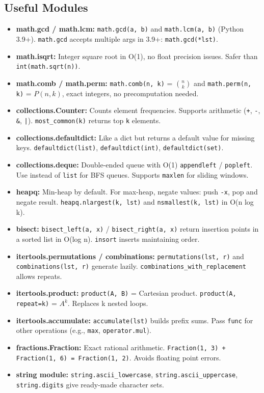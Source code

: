 \subsection{Useful Modules}

\begin{itemize}
    \item \textbf{math.gcd / math.lcm: } \texttt{math.gcd(a, b)} and \texttt{math.lcm(a, b)} (Python 3.9+). \texttt{math.gcd} accepts multiple args in 3.9+: \texttt{math.gcd(*lst)}.
    \item \textbf{math.isqrt: } Integer square root in O(1), no float precision issues. Safer than \texttt{int(math.sqrt(n))}.
    \item \textbf{math.comb / math.perm: } \texttt{math.comb(n, k)} = $\binom{n}{k}$ and \texttt{math.perm(n, k)} = $P(n,k)$, exact integers, no precomputation needed.
    \item \textbf{collections.Counter: } Counts element frequencies. Supports arithmetic (\texttt{+}, \texttt{-}, \texttt{\&}, \texttt{|}). \texttt{most\_common(k)} returns top \texttt{k} elements.
    \item \textbf{collections.defaultdict: } Like a dict but returns a default value for missing keys. \texttt{defaultdict(list)}, \texttt{defaultdict(int)}, \texttt{defaultdict(set)}.
    \item \textbf{collections.deque: } Double-ended queue with O(1) \texttt{appendleft} / \texttt{popleft}. Use instead of \texttt{list} for BFS queues. Supports \texttt{maxlen} for sliding windows.
    \item \textbf{heapq: } Min-heap by default. For max-heap, negate values: push \texttt{-x}, pop and negate result. \texttt{heapq.nlargest(k, lst)} and \texttt{nsmallest(k, lst)} in O(n log k).
    \item \textbf{bisect: } \texttt{bisect\_left(a, x)} / \texttt{bisect\_right(a, x)} return insertion points in a sorted list in O(log n). \texttt{insort} inserts maintaining order.
    \item \textbf{itertools.permutations / combinations: } \texttt{permutations(lst, r)} and \texttt{combinations(lst, r)} generate lazily. \texttt{combinations\_with\_replacement} allows repeats.
    \item \textbf{itertools.product: } \texttt{product(A, B)} = Cartesian product. \texttt{product(A, repeat=k)} = $A^k$. Replaces k nested loops.
    \item \textbf{itertools.accumulate: } \texttt{accumulate(lst)} builds prefix sums. Pass \texttt{func} for other operations (e.g., \texttt{max}, \texttt{operator.mul}).
    \item \textbf{fractions.Fraction: } Exact rational arithmetic. \texttt{Fraction(1, 3) + Fraction(1, 6) = Fraction(1, 2)}. Avoids floating point errors.
    \item \textbf{string module: } \texttt{string.ascii\_lowercase}, \texttt{string.ascii\_uppercase}, \texttt{string.digits} give ready-made character sets.
\end{itemize}

